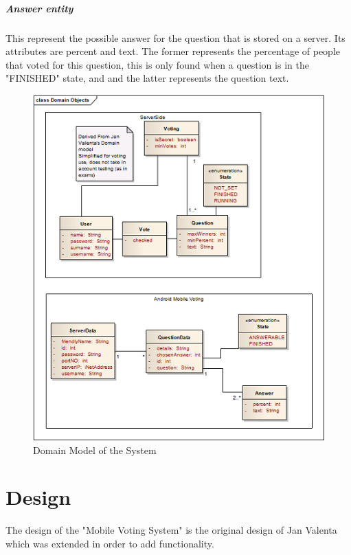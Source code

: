 \documentclass[11pt,twoside,a4paper]{book}
\begin{document}
\paragraph{Answer entity} 
This represent the possible answer for the question that is stored on a server. Its attributes are percent and text. The former represents the percentage of people that voted for this question, this is only found when a question is in the "FINISHED" state, and and the latter represents the question text.





\begin{figure}[h]
\begin{center}
\includegraphics[scale=1]{figures/DomainObjects.png} 
\caption{Domain Model of the System}
\label{fig:Domain Model}
\end{center}
\end{figure}




\chapter{Design}
The design of the "Mobile Voting System" is the original design of Jan Valenta which was extended in order to add functionality.
\end{document}
